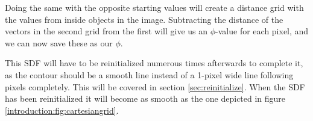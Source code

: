 Doing the same with the opposite starting values will create a
distance grid with the values from inside objects in the
image. Subtracting the distance of the vectors in the second grid
from the first will give us an $\phi$-value for each pixel, and we can
now save these as our $\phi$.

This SDF will have to be reinitialized numerous times afterwards to
complete it, as the contour should be a smooth line instead of a
1-pixel wide line following pixels completely. This will be covered in
section \vref{sec:reinitialize}. When the SDF has been reinitialized
it will become as smooth as the one depicted in figure
\vref{introduction:fig:cartesiangrid}.



